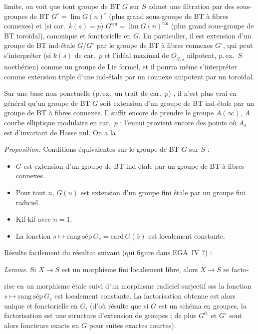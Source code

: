 \documentclass[11pt,a4paper]{article}
\begin{document}
limite, on voit que tout groupe de BT $G$ sur $S$  admet une filtration par des sous-groupes de BT $G^{\circ} = \lim G(n)^{\circ}$ (plus grand sous-groupe de BT à fibres connexes) et (si car.\ $k(s) = p$) $G^{\mathrm{tm}} = \lim G(n)^{\mathrm{tm}}$ (plus grand sous-groupe de BT  toroïdal), canonique et fonctorielle en $G$. En particulier, il est extension d'un groupe de BT ind-étale $G/G^{\circ}$ par le groupe de BT à fibres connexes $G^{\circ}$, qui peut s'interpréter (si $k(s)$ de car.\ $p$ \struck{\ill{}} et l'idéal maximal de $\underline{O}_{S,s}$ nilpotent, p.\,ex.\ $S$ noethérien) comme un groupe de Lie formel, et il pourra même s'interpréter comme extension triple d'une ind-étale par un connexe unipotent par un toroïdal.

Sur une base non ponctuelle (p.\,ex.\ un trait de car.\ $p$) \struck{\ill{}}, il n'est plus vrai en général qu'un groupe de BT $G$  soit extension d'un groupe de BT ind-étale par un groupe de BT à fibres connexes. Il suffit encore de prendre le groupe $A(\infty)$, $A$ courbe elliptique modulaire en car.\ $p$ : l'ennui provient encore des points où $A_s$ est d'invariant de Hasse nul. On a la

\emph{Proposition.} Conditions équivalentes sur le groupe de BT $G$ sur $S$ :
\begin{itemize}
  \item[(i)] $G$ est extension d'un groupe de BT ind-étale par un groupe de BT à fibres connexes.
  \item[(ii)] Pour tout $n$, $G(n)$ est extension d'un groupe fini étale par un groupe fini radiciel.
  \item[(iii)] Kif-kif avec $n = 1$.
  \item[(iv)] La fonction $s \mapsto \mathrm{rang\ sép}\, G_s = \mathrm{card}\, G(\bar s)$ est localement constante.
\end{itemize}
Résulte facilement du résultat suivant (qui figure dans EGA~IV ?) :

\emph{Lemme.} Si $X \to S$ est un morphisme fini localement libre, alors $X \to S$ se facto-

rise en un morphisme  étale suivi d'un morphisme radiciel surjectif sss la fonction $s \mapsto \mathrm{rang\ sép}\, G_s$ est localement constante. La factorisation obtenue est alors unique et fonctorielle en $G$,  (d'où résulte que si $G$ est un schéma en groupes, la factorisation est une structure d'extension de groupes ; de plus $G^{\text{ét}}$ et $G^{\circ}$ sont alors foncteurs exacts en $G$ pour suites exactes courtes).
\end{document}
